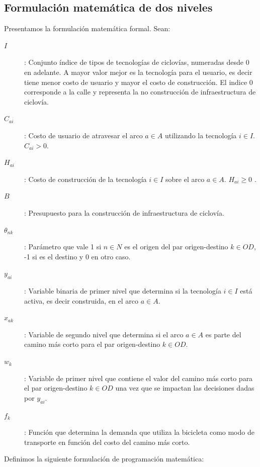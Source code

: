 \documentclass{article}
\begin{document}
 \FloatBarrier
 \subsection{Formulación matemática de dos niveles}

  Presentamos la formulación matemática formal. Sean:

  \begin{description}
    \item[$I$]: Conjunto índice de tipos de tecnologías de ciclovías, numeradas desde $0$ en adelante. A mayor valor mejor es la tecnología para el usuario, es decir tiene menor costo de usuario y mayor el costo de construcción. El indice 0 corresponde a la calle y representa la no construcción de infraestructura de ciclovía.
    \item[$C_{ai}$]: Costo de usuario de atravesar el arco $a \in A$ utilizando la tecnología $i \in I$. $C_{ai} > 0$.
    \item[$H_{ai}$]: Costo de construcción de la tecnología $i \in I$ sobre el arco $a \in A$. $H_{ai} \geq 0$ .
    \item[$B$]: Presupuesto para la construcción de infraestructura de ciclovía.
    \item[$\theta_{nk}$]: Parámetro que vale 1 si $n \in N$ es el origen del par origen-destino $k \in OD$, -1 si es el destino y 0 en otro caso.
    \item[$y_{ai}$]: Variable binaria de primer nivel que determina si la tecnología $i \in I$ está activa, es decir construida, en el arco $a \in A$.
    \item[$x_{ak}$]: Variable de segundo nivel que determina si el arco $a \in A$ es parte del camino más corto para el par origen-destino $k \in OD$.
    \item[$w_k$]: Variable de primer nivel que contiene el valor del camino más corto para el par origen-destino $k \in OD$ una vez que se impactan las decisiones dadas por $y_{ai}$. \item[$f_k$]: Función que determina la demanda que utiliza la bicicleta como modo de transporte en función del costo del camino más corto. \end{description}

  Definimos la siguiente formulación de programación matemática:
\end{document}
